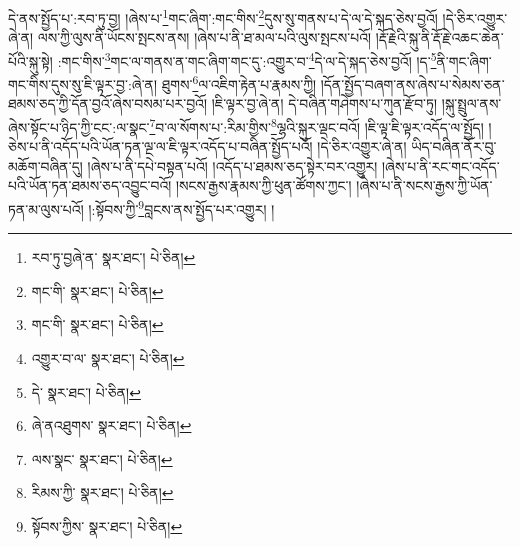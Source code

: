 དེ་ནས་སྤྱོད་པ་:རབ་ཏུ་བྱ། །ཞེས་པ་\footnote{རབ་ཏུ་བྱཞེ་ན་  སྣར་ཐང་།  པེ་ཅིན། }གང་ཞིག་:གང་གིས་\footnote{གང་གི་  སྣར་ཐང་།  པེ་ཅིན། }དུས་སུ་གནས་པ་དེ་ལ་དེ་སྐད་ཅེས་བྱའོ། །དེ་ཅིར་འགྱུར་ཞེ་ན། ལས་ཀྱི་ལུས་ནི་ཡོངས་སྤངས་ནས། །ཞེས་པ་ནི་ཐ་མལ་པའི་ལུས་སྤངས་པའོ། །རྡོ་རྗེའི་སྐུ་ནི་རྡོ་རྗེ་འཆང་ཆེན་པོའི་སྐུ་སྟེ། :གང་གིས་\footnote{གང་གི་  སྣར་ཐང་།  པེ་ཅིན། }གང་ལ་གནས་ན་གང་ཞིག་གང་དུ་:འགྱུར་བ་\footnote{འགྱུར་བ་ལ་  སྣར་ཐང་།  པེ་ཅིན། }དེ་ལ་དེ་སྐད་ཅེས་བྱའོ། །ད་\footnote{དེ་  སྣར་ཐང་།  པེ་ཅིན། }ནི་གང་ཞིག་གང་གིས་དུས་སུ་ཇི་ལྟར་བྱ་:ཞེ་ན། ཐུགས་\footnote{ཞེ་ནའཐུགས་  སྣར་ཐང་།  པེ་ཅིན། }ལ་འཇིག་རྟེན་པ་རྣམས་ཀྱི། །དོན་སྤྱོད་བཞག་ནས་ཞེས་པ་སེམས་ཅན་ཐམས་ཅད་ཀྱི་དོན་བྱའོ་ཞེས་བསམ་པར་བྱའོ། །ཇི་ལྟར་བྱ་ཞེ་ན། དེ་བཞིན་གཤེགས་པ་ཀུན་རྫོབ་ཏུ། །སྐུ་སྤྲུལ་ནས་ཞེས་སྟོང་པ་ཉིད་ཀྱི་ངང་:ལ་སྣང་\footnote{ལས་སྣང་  སྣར་ཐང་།  པེ་ཅིན། }བ་ལ་སོགས་པ་:རིམ་གྱིས་\footnote{རིམས་ཀྱི་  སྣར་ཐང་།  པེ་ཅིན། }ལྷའི་སྐུར་ལྡང་བའོ། །ཇི་ལྟ་ཇི་ལྟར་འདོད་ལ་སྤྱོད། །ཅེས་པ་ནི་འདོད་པའི་ཡོན་ཏན་ལྔ་ལ་ཇི་ལྟར་འདོད་པ་བཞིན་སྤྱོད་པའོ། །དེ་ཅིར་འགྱུར་ཞེ་ན། ཡིད་བཞིན་ནོར་བུ་མཆོག་བཞིན་དུ། །ཞེས་པ་ནི་དཔེ་བསྟན་པའོ། །འདོད་པ་ཐམས་ཅད་སྟེར་བར་འགྱུར། །ཞེས་པ་ནི་རང་གང་འདོད་པའི་ཡོན་ཏན་ཐམས་ཅད་འབྱུང་བའོ། །སངས་རྒྱས་རྣམས་ཀྱི་ཕུན་ཚོགས་ཀྱང་། །ཞེས་པ་ནི་སངས་རྒྱས་ཀྱི་ཡོན་ཏན་མ་ལུས་པའོ། །:སྟོབས་ཀྱི་\footnote{སྟོབས་ཀྱིས་  སྣར་ཐང་།  པེ་ཅིན། }བླངས་ནས་སྤྱོད་པར་འགྱུར། །
